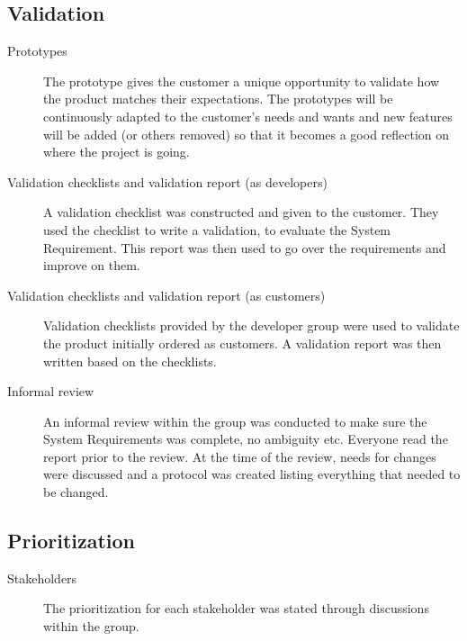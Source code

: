 \documentclass[10pt,a4paper]{article}
\begin{document}
\subsection{Validation}
\begin{description}
\item[Prototypes] The prototype gives the customer a unique opportunity to validate how the product matches their expectations. The prototypes will be continuously adapted to the customer's needs and wants and new features will be added (or others removed) so that it becomes a good reflection on where the project is going. 

\item[Validation checklists and validation report (as developers)] A validation checklist was constructed and given to the customer. They used the checklist to write a validation, to evaluate the System Requirement. This report was then used to go over the requirements and improve on them.

\item[Validation checklists and validation report (as customers)] Validation checklists provided by the developer group were used to validate the product initially ordered as customers. A validation report was then written based on the checklists.

\item[Informal review] An informal review within the group was conducted to make sure the System Requirements was complete, no ambiguity etc. Everyone read the report prior to the review. At the time of the review, needs for changes were discussed and a protocol was created listing everything that needed to be changed. 
\end{description}


\subsection{Prioritization}
\begin{description}
\item[Stakeholders] The prioritization for each stakeholder was stated through discussions within the group.  
\end{description}
\end{document}
